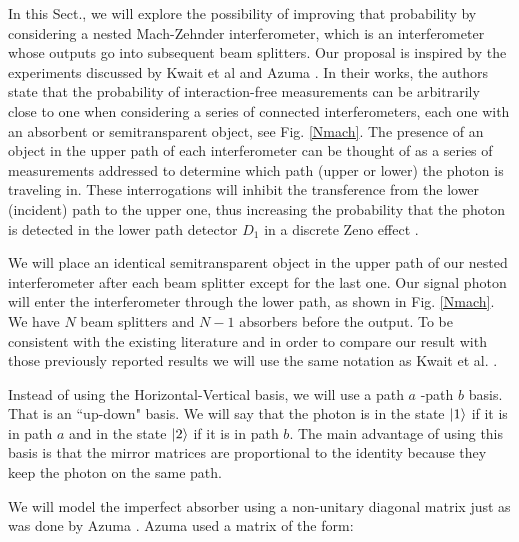 \documentclass[12pt]{book}
\begin{document}
In this Sect., we will explore the possibility of improving that probability by considering a nested Mach-Zehnder interferometer, which is an interferometer whose outputs go into subsequent beam splitters. Our proposal is inspired by the experiments discussed by Kwait et al \cite{5} and Azuma \cite{Azuma}. In their works, the authors state that the probability of interaction-free measurements can be arbitrarily close to one when considering a series of connected interferometers, each one with an absorbent or semitransparent object, see Fig. \ref{Nmach}. The presence of an object in the upper path of each interferometer can be thought of as a series of measurements addressed to determine which path (upper or lower) the photon is traveling in. These interrogations will inhibit the transference from the lower (incident) path to the upper one, thus increasing the probability that the photon is detected in the lower path detector $D_{1}$ in a discrete Zeno effect \cite{5}.

  We will place an identical semitransparent object in the upper path of our nested interferometer after each beam splitter except for the last one. Our signal photon will enter the interferometer through the lower path, as shown in Fig. \ref{Nmach}. We have $N$ beam splitters and $N-1$ absorbers before the output. To be consistent with the existing literature and in order to compare our result with those previously reported results we will use the same notation as Kwait et al. \cite{5}.
 
 
Instead of using the Horizontal-Vertical basis, we will use a path $a$ -path $b$ basis. That is an ``up-down" basis. We will say that the photon is in the state $\ket{1}$ if it is in path $a$ and in the state $\ket{2}$ if it is in path $b$. The main advantage of using this basis is that the mirror matrices are proportional to the identity because they keep the photon on the same path.
 

 
 
  We will model the imperfect absorber using a non-unitary diagonal matrix just as was done by  Azuma \cite{Azuma}. Azuma used a matrix of the form:
 
\end{document}
